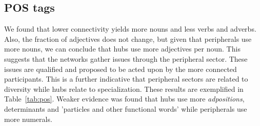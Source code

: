 																																												\subsection{POS tags}\label{subsec:pos}
																																												We found that lower connectivity yields more nouns and less verbs and adverbs.
																																												Also, the fraction of adjectives does not change,
																																												but given that peripherals use more nouns,
																																												we can conclude that hubs use more adjectives per noun.
																																												This suggests that the networks gather issues
																																												through the peripheral sector. 
																																												These issues are qualified and proposed to be acted upon
																																												by the more connected participants.
																																												This is a further indicative that peripheral sectors
																																												are related to diversity while hubs relate to specialization.
																																												These results are exemplified in Table~\ref{tab:pos}.
																																												Weaker evidence was found that hubs use more \emph{adpositions},
																																												determinants and 'particles and other functional words' while
																																												peripherals use more numerals.
																																												
																																												\FloatBarrier


